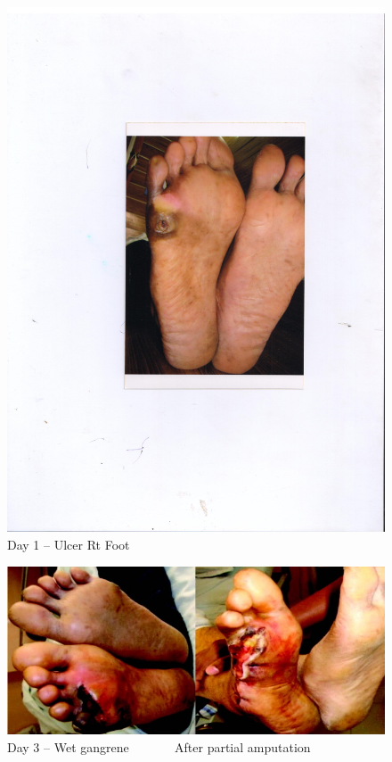 {\begin{figure}
\includegraphics{images/069.jpg}
\caption{Day 1 – Ulcer Rt Foot}
\end{figure}


\begin{figure}
\includegraphics{images/070.jpg}
\caption{Day 3 – Wet gangrene         After partial amputation}
\end{figure}

}
